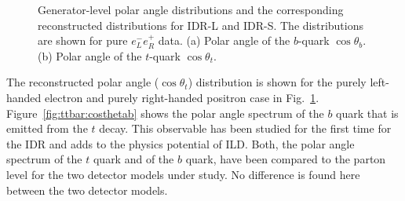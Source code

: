 \begin{figure}[htbp]
\begin{subfigure}{0.475\hsize}
 \caption{  \label{fig:ttbar:costhetat}}
 \end{subfigure}
\caption{Generator-level polar angle distributions and the corresponding reconstructed distributions for IDR-L and IDR-S. The distributions are shown for pure $e^-_L e^+_R$ data.
(a) Polar angle of the $b$-quark $\cos{\theta_b}$. 
(b) Polar angle of the $t$-quark $\cos{\theta_t}$.
}
\label{fig:ttbar:result}
\end{figure}

The reconstructed  polar angle ($\cos{\theta_t}$) distribution is shown for the purely left-handed electron and purely right-handed positron case in Fig.~\ref{fig:ttbar:costhetat}. Figure~\ref{fig:ttbar:costhetab} shows the polar angle spectrum of the $b$ quark that is emitted from the $t$ decay. This observable has been studied for the first time for the IDR and adds to the physics potential of ILD.  Both, the polar angle spectrum of the $t$ quark and of the $b$ quark, have been compared to the parton level for the two detector models under study. No difference is found here between the two detector models.
 
